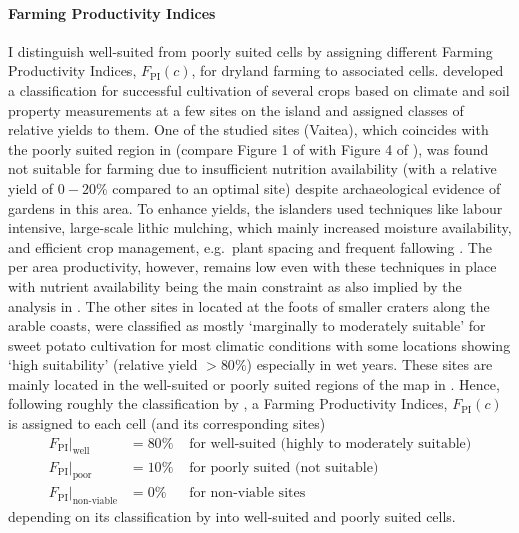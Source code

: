 \paragraph{Farming Productivity Indices}
I distinguish well-suited from poorly suited cells by assigning different Farming Productivity Indices, $F_\text{PI}(c)$, for dryland farming to associated cells.
\citet{Louwagie2006} developed a classification for successful cultivation of several crops based on climate and soil property measurements at a few sites on the island and assigned classes of relative yields to them. 
One of the studied sites (Vaitea), which coincides with the poorly suited region in \citet{Puleston2017} (compare Figure 1 of \citet{Louwagie2006} with Figure 4 of \citet{Puleston2017}), was found not suitable for farming due to insufficient nutrition availability (with a relative yield of $0-20\%$ compared to an optimal site) despite archaeological evidence of gardens in this area.
To enhance yields, the islanders used techniques like labour intensive, large-scale lithic mulching, which mainly increased moisture availability, and efficient crop management, e.g.\ plant spacing and frequent fallowing \citep{Louwagie2006}.
The per area productivity, however, remains low even with these techniques in place with nutrient availability being the main constraint as also implied by the analysis in \citet{Puleston2017}.
The other sites in \citet{Louwagie2006} located at the foots of smaller craters along the arable coasts, were classified as mostly `marginally to moderately suitable' for sweet potato cultivation for most climatic conditions with some locations showing `high suitability' (relative yield $>80\%$) especially in wet years. 
These sites are mainly located in the well-suited or poorly suited regions of the map in \citet{Puleston2017}.
Hence, following roughly the classification by \citet{Louwagie2006}, a Farming Productivity Indices, $F_\text{PI}(c)$ is assigned to each cell (and its corresponding sites)
\begin{eqnarray*}
	F_\text{PI}|_\text{well} & = 80\% & \text{ for well-suited (highly to moderately suitable)}\\
	F_\text{PI}|_\text{poor} & = 10\%  & \text{ for poorly suited (not suitable)}\\
	F_\text{PI}|_\text{non-viable} & = 0\% & \text{ for non-viable sites}
\end{eqnarray*}
depending on its classification by \citet{Puleston2017} into well-suited and poorly suited cells.

